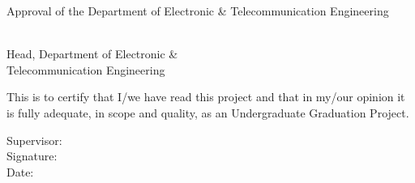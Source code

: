 \begin{flushleft}
\large{
	Approval of the Department of Electronic \& Telecommunication Engineering \\
}
	
  \vspace{30mm}

  \normalsize
\begin{multicols}{2}
	\vfill\null
	\columnbreak
	\begin{center}

		{\makebox[7cm]{\dotfill}} \\ 
		Head, Department of Electronic \& \\
		Telecommunication Engineering
 \\
	\end{center}
\end{multicols}


  \vspace{20mm}

This is to certify that I/we have read this project and that in my/our opinion it is fully adequate, in scope and quality, as an Undergraduate Graduation Project. \\

  \vspace{10mm}
  
  Supervisor: \supervisorA \\
    \vspace{15mm}
  Signature:  {\makebox[7cm]{\dotfill}}
\\
    \vspace{10mm}
  Date: {\makebox[7.9cm]{\dotfill}}
\\

\end{flushleft}
